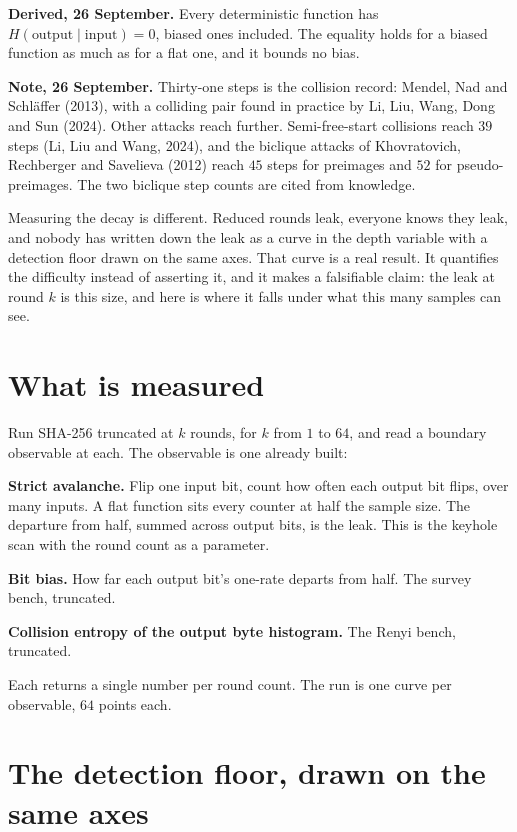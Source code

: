 \textbf{Derived, 26 September.} Every deterministic function has \(H(\text{output} \mid \text{input}) = 0\), biased ones included. The equality holds for a biased function as much as for a flat one, and it bounds no bias.

\textbf{Note, 26 September.} Thirty-one steps is the collision record: Mendel, Nad and Schl\"affer (2013), with a colliding pair found in practice by Li, Liu, Wang, Dong and Sun (2024). Other attacks reach further. Semi-free-start collisions reach \(39\) steps (Li, Liu and Wang, 2024), and the biclique attacks of Khovratovich, Rechberger and Savelieva (2012) reach \(45\) steps for preimages and \(52\) for pseudo-preimages. The two biclique step counts are cited from knowledge.

Measuring the decay is different. Reduced rounds leak, everyone knows they leak, and nobody has written down the leak as a curve in the depth variable with a detection floor drawn on the same axes. That curve is a real result. It quantifies the difficulty instead of asserting it, and it makes a falsifiable claim: the leak at round \(k\) is this size, and here is where it falls under what this many samples can see.

\section{What is measured}

Run SHA-256 truncated at \(k\) rounds, for \(k\) from \(1\) to \(64\), and read a boundary observable at each. The observable is one already built:

\textbf{Strict avalanche.} Flip one input bit, count how often each output bit flips, over many inputs. A flat function sits every counter at half the sample size. The departure from half, summed across output bits, is the leak. This is the keyhole scan with the round count as a parameter.

\textbf{Bit bias.} How far each output bit's one-rate departs from half. The survey bench, truncated.

\textbf{Collision entropy of the output byte histogram.} The Renyi bench, truncated.

Each returns a single number per round count. The run is one curve per observable, \(64\) points each.

\section{The detection floor, drawn on the same axes}

